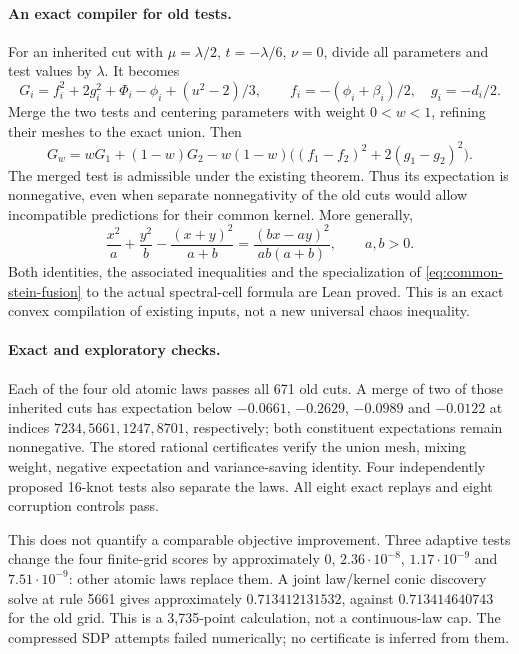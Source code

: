 \paragraph{An exact compiler for old tests.}
For an inherited cut with $\mu=\lambda/2$, $t=-\lambda/6$, $\nu=0$,
divide all parameters and test values by $\lambda$. It becomes
\[
 G_i=f_i^2+2g_i^2+\Phi_i-\phi_i+(u^2-2)/3,
 \qquad f_i=-(\phi_i+\beta_i)/2,\quad g_i=-d_i/2.
\]
Merge the two tests and centering parameters with weight $0<w<1$, refining
their meshes to the exact union. Then
\begin{equation}\label{eq:common-stein-fusion}
 G_w=wG_1+(1-w)G_2
 -w(1-w)\bigl((f_1-f_2)^2+2(g_1-g_2)^2\bigr).
\end{equation}
The merged test is admissible under the existing
 theorem. Thus its expectation is
nonnegative, even when separate nonnegativity of the old cuts would allow
incompatible predictions for their common kernel. More generally,
\[
 \frac{x^2}{a}+\frac{y^2}{b}-\frac{(x+y)^2}{a+b}
 =\frac{(bx-ay)^2}{ab(a+b)},\qquad a,b>0.
\]
Both identities, the associated inequalities and the specialization of
\eqref{eq:common-stein-fusion} to the actual spectral-cell formula are
Lean proved. This is an exact convex compilation of existing inputs, not a
new universal chaos inequality.

\paragraph{Exact and exploratory checks.}
Each of the four old atomic laws passes all 671 old cuts. A merge of two of
those inherited cuts has expectation below $-0.0661$, $-0.2629$, $-0.0989$ and
$-0.0122$ at indices $7234,5661,1247,8701$, respectively; both constituent
expectations remain nonnegative. The stored rational certificates verify
the union mesh, mixing weight, negative expectation and variance-saving
identity. Four independently proposed 16-knot tests also separate the laws.
All eight exact replays and eight corruption controls pass.

This does not quantify a comparable objective improvement. Three adaptive
tests change the four finite-grid scores by approximately $0$, $2.36\cdot10^{-8}$,
$1.17\cdot10^{-9}$ and $7.51\cdot10^{-9}$: other atomic laws replace them.
A joint law/kernel conic discovery solve at rule 5661 gives approximately
$0.713412131532$, against $0.713414640743$ for the old grid. This is a
3,735-point calculation, not a continuous-law cap. The compressed SDP attempts
failed numerically; no certificate is inferred from them.

